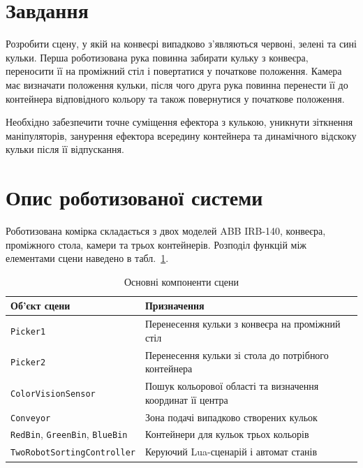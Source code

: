 \documentclass[12pt,a4paper]{article}
\begin{document}
\section{Завдання}

Розробити сцену, у якій на конвеєрі випадково з'являються червоні, зелені
та сині кульки. Перша роботизована рука повинна забирати кульку з конвеєра,
переносити її на проміжний стіл і повертатися у початкове положення.
Камера має визначати положення кульки, після чого друга рука повинна
перенести її до контейнера відповідного кольору та також повернутися у
початкове положення.

Необхідно забезпечити точне суміщення ефектора з кулькою, уникнути
зіткнення маніпуляторів, занурення ефектора всередину контейнера та
динамічного відскоку кульки після її відпускання.

\section{Опис роботизованої системи}

Роботизована комірка складається з двох моделей ABB IRB-140, конвеєра,
проміжного стола, камери та трьох контейнерів. Розподіл функцій між
елементами сцени наведено в табл.~\ref{tab:scene-components}.

\begin{table}[H]
  \centering
  \renewcommand{\arraystretch}{1.18}
  \begin{tabular}{|p{}|p{}|}
    \hline
    \textbf{Об'єкт сцени} & \textbf{Призначення} \\
    \hline
    \texttt{Picker1} & Перенесення кульки з конвеєра на проміжний стіл \\ \hline
    \texttt{Picker2} & Перенесення кульки зі стола до потрібного контейнера \\ \hline
    \texttt{ColorVisionSensor} & Пошук кольорової області та визначення координат її центра \\ \hline
    \texttt{Conveyor} & Зона подачі випадково створених кульок \\ \hline
    \texttt{RedBin}, \texttt{GreenBin}, \texttt{BlueBin} & Контейнери для кульок трьох кольорів \\ \hline
    \texttt{TwoRobotSortingController} & Керуючий Lua-сценарій і автомат станів \\ \hline
  \end{tabular}
  \caption{Основні компоненти сцени}
  \label{tab:scene-components}
\end{table}
\end{document}
